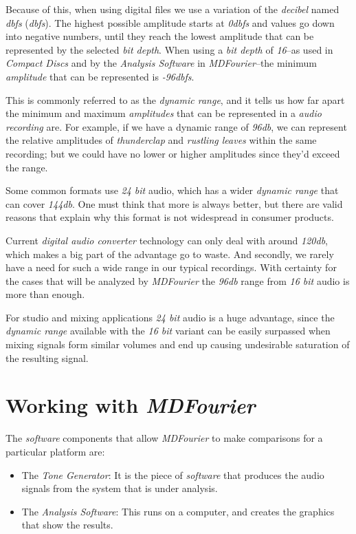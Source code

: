 \documentclass[10pt,a4paper]{report}
\newcommand{\define}[1]{\textit{\acrlong{#1}} (\textit{\acrshort{#1}})}
\newcommand{\db}[1]{\textit{\mbox{#1\acrshort{dbfs}}}}
\newcommand{\dbSPL}[1]{\textit{\mbox{#1\acrshort{db}}}}
\begin{document}
Because of this, when using digital files we use a variation of the \textit{decibel} named \define{dbfs}. The highest possible amplitude starts at \db{0} and values go down into negative numbers, until they reach the lowest amplitude that can be represented by the selected \textit{bit depth}. When using a \textit{bit depth} of \textit{16}--as used in \textit{Compact Discs} and by the \textit{Analysis Software} in \textit{MDFourier}--the minimum \textit{amplitude} that can be represented is \db{-96}.

This is commonly referred to as the \textit{dynamic range}, and it tells us how far apart the minimum and maximum \textit{amplitudes} that can be represented in a \textit{audio recording} are. For example, if we have a dynamic range of \dbSPL{96}, we can represent the relative amplitudes of \textit{thunderclap} and \textit{rustling leaves} within the same recording; but we could have no lower or higher amplitudes since they'd exceed the range.

Some common formats use \textit{24 bit} audio, which has a wider \textit{dynamic range} that can cover \dbSPL{144}. One must think that more is always better, but there are valid reasons that explain why this format is not widespread in consumer products.

Current \textit{digital audio converter} technology can only deal with around \dbSPL{120}, which makes a big part of the advantage go to waste. And secondly, we rarely have a need for such a wide range in our typical recordings. With certainty for the cases that will be analyzed by \textit{MDFourier} the \dbSPL{96} range from \textit{16 bit} audio is more than enough. 

For studio and mixing applications \textit{24 bit} audio is a huge advantage, since the \textit{dynamic range} available with the \textit{16 bit} variant can be easily surpassed when mixing signals form similar volumes and end up causing undesirable saturation of the resulting signal.


\chapter{Working with \textit{MDFourier}}
\label{workflow}

The \textit{software} components that allow \textit{MDFourier} to make comparisons for a particular platform are:

\begin{itemize}
	\item The \textit{Tone Generator}: It is the piece of \textit{software} that produces the audio signals from the system that is under analysis. 
	\item The \textit{Analysis Software}: This runs on a computer, and creates the graphics that show the results. 
\end{itemize}
\end{document}
